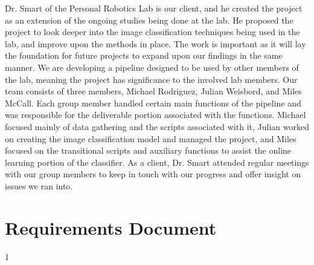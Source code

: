 \documentclass[draftclsnofoot, onecolumn, 10pt, compsoc]{IEEEtran}
\begin{document}
Dr. Smart of the Personal Robotics Lab is our client, and he created the project as an extension of the ongoing studies being done at the lab. He proposed the project to look deeper into the image classification techniques being used in the lab, and improve upon the methods in place. The work is important as it will lay the foundation for future projects to expand upon our findings in the same manner. We are developing a pipeline designed to be used by other members of the lab, meaning the project has significance to the involved lab members. Our team consists of three members, Michael Rodriguez, Julian Weisbord, and Miles McCall. Each group member handled certain main functions of the pipeline and was responsible for the deliverable portion associated with the functions. Michael focused mainly of data gathering and the scripts associated with it, Julian worked on creating the image classification model and managed the project, and Miles focused on the transitional scripts and auxiliary functions to assist the online learning portion of the classifier. As a client, Dr. Smart attended regular meetings with our group members to keep in touch with our progress and offer insight on issues we ran into. 

\newpage



\section{Requirements Document}
  1       \newpage
  
\end{document}
